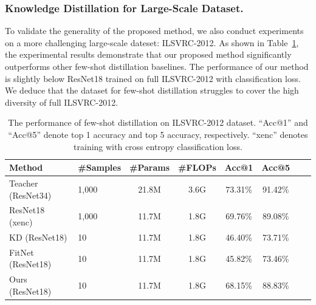 \documentclass[letterpaper]{article} %
\begin{document}
{{{        \subsubsection{Knowledge Distillation for Large-Scale Dataset.}
        To validate the generality of the proposed method, we also conduct experiments on a more challenging large-scale dateset: ILSVRC-2012.
        As shown in Table~\ref{table:imagenet}, the experimental results demonstrate that our proposed method significantly outperforms other few-shot distillation baselines.
        The performance of our method is slightly below ResNet18 trained on full ILSVRC-2012 with classification loss.
        We deduce that the dataset for few-shot distillation struggles to cover the high diversity of full ILSVRC-2012.

        \begin{table}[ht]
        \centering
        \resizebox{\linewidth}{!}
        {
            \begin{tabular}{llcccccc}
            \toprule
            \textbf{Method} & \textbf{\#Samples} & \textbf{\#Params} & \textbf{\#FLOPs} & \textbf{Acc@1} & \textbf{Acc@5}\\
            \hline
            Teacher (ResNet34)
                                & 1,000           & 21.8M         & 3.6G     & 73.31\%        &  91.42\%    \\
            ResNet18 (xenc)
                                & 1,000           & 11.7M         & 1.8G     & 69.76\%        &  89.08\%    \\
            \hline
            KD (ResNet18)
                                & 10              & 11.7M         & 1.8G     & 46.40\%        &  73.71\%   \\
            FitNet (ResNet18)
                                & 10              & 11.7M         & 1.8G     & 45.82\%        &  73.46\%   \\
            Ours (ResNet18)
                                & 10              & 11.7M         & 1.8G     & 68.15\%        &  88.83\%   \\
            \bottomrule
            \end{tabular}

        }
        \caption{The performance of few-shot distillation on ILSVRC-2012 dataset.
        ``Acc@1'' and ``Acc@5'' denote top 1 accuracy and top 5 accuracy, respectively.
        ``xenc'' denotes training with cross entropy classification loss.}
        \label{table:imagenet}
        \end{table}
        }


}}
\end{document}
